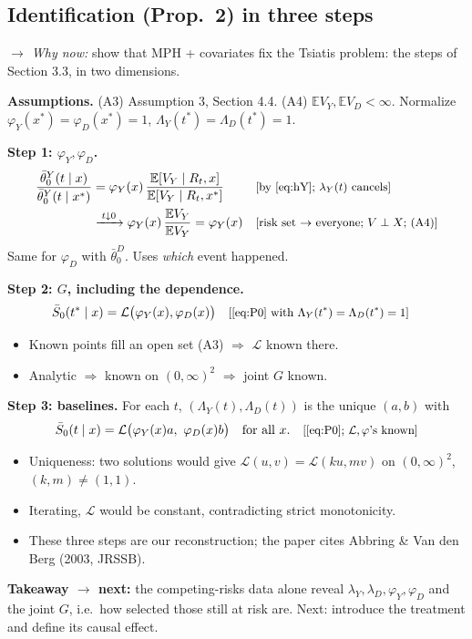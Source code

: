 \documentclass[11pt]{article}
\newcommand{\E}{\mathbb{E}}
\newcommand{\1}{\mathbf{1}}
\newcommand{\Lap}{\mathcal{L}}
\newcommand{\why}[1]{\text{\small[#1]}}
\newcommand{\whynow}[1]{\par\noindent\textit{$\rightarrow$ Why now:} #1\par}
\newcommand{\takeaway}[1]{\par\noindent\textbf{Takeaway $\rightarrow$ next:} #1\par}
\begin{document}
\subsection{Identification (Prop.~2) in three steps}
\whynow{show that MPH + covariates fix the Tsiatis problem: the steps of Section 3.3, in two dimensions.}
\textbf{Assumptions.} (A3) Assumption 3, Section 4.4. (A4) $\E V_Y,\E V_D<\infty$. Normalize $\varphi_Y(x^*)=\varphi_D(x^*)=1$, $\Lambda_Y(t^*)=\Lambda_D(t^*)=1$.

\textbf{Step 1: $\varphi_Y,\varphi_D$.}
\begin{align}
  \frac{\bar\theta^Y_0(t\mid x)}{\bar\theta^Y_0(t\mid x^*)} &= \varphi_Y(x)\,\frac{\E[V_Y\mid R_t,x]}{\E[V_Y\mid R_t,x^*]} && \why{by \eqref{eq:hY}; $\lambda_Y(t)$ cancels} \nonumber\\
  &\xrightarrow{\;t\downarrow0\;}\varphi_Y(x)\,\frac{\E V_Y}{\E V_Y}=\varphi_Y(x) && \why{risk set $\to$ everyone; $V\perp X$; (A4)} \nonumber
\end{align}
Same for $\varphi_D$ with $\bar\theta^D_0$. Uses \emph{which} event happened.

\textbf{Step 2: $G$, including the dependence.}
\begin{align}
  \bar S_0(t^*\mid x) &= \Lap\big(\varphi_Y(x),\varphi_D(x)\big) && \why{\eqref{eq:P0} with $\Lambda_Y(t^*)=\Lambda_D(t^*)=1$} \nonumber
\end{align}
\begin{itemize}
  \item Known points fill an open set (A3) $\Rightarrow$ $\Lap$ known there.
  \item Analytic $\Rightarrow$ known on $(0,\infty)^2$ $\Rightarrow$ joint $G$ known.
\end{itemize}

\textbf{Step 3: baselines.} For each $t$, $(\Lambda_Y(t),\Lambda_D(t))$ is the unique $(a,b)$ with
\begin{align}
  \bar S_0(t\mid x)=\Lap\big(\varphi_Y(x)a,\ \varphi_D(x)b\big)\quad\text{for all }x. && \why{\eqref{eq:P0}; $\Lap,\varphi$'s known} \nonumber
\end{align}
\begin{itemize}
  \item Uniqueness: two solutions would give $\Lap(u,v)=\Lap(ku,mv)$ on $(0,\infty)^2$, $(k,m)\neq(1,1)$.
  \item Iterating, $\Lap$ would be constant, contradicting strict monotonicity.
  \item These three steps are our reconstruction; the paper cites Abbring \& Van den Berg (2003, JRSSB).
\end{itemize}
\takeaway{the competing-risks data alone reveal $\lambda_Y,\lambda_D,\varphi_Y,\varphi_D$ and the joint $G$, i.e.\ how selected those still at risk are. Next: introduce the treatment and define its causal effect.}
\end{document}
